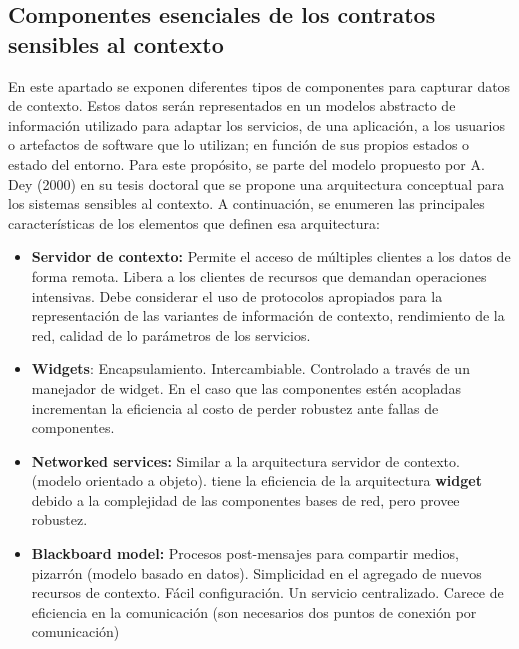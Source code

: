 \subsection{Componentes esenciales de los contratos sensibles al contexto}

En este apartado se exponen diferentes tipos de componentes para capturar datos de 
contexto. Estos datos serán representados en un modelos abstracto de información  utilizado para adaptar los servicios, de una aplicación, a los usuarios o artefactos de software que lo utilizan; en función de sus propios estados o estado del entorno. Para este propósito, se parte del modelo propuesto por A. Dey (2000) en su tesis doctoral \cite{Dey} que se propone una arquitectura conceptual para los sistemas sensibles  al contexto. A continuación, se enumeren las principales características de los elementos que definen esa arquitectura:


\begin{itemize}

\item \textbf {Servidor de contexto:}  Permite el acceso de múltiples
clientes a los datos de forma remota.  Libera a los clientes de
recursos que demandan operaciones intensivas.  Debe considerar el uso
de protocolos apropiados para la representación de las variantes de información de contexto, rendimiento de la red, calidad de lo parámetros de los servicios.


\item \textbf{Widgets}:  Encapsulamiento.  Intercambiable.
Controlado a través de un manejador de widget. En el caso que las
componentes estén acopladas incrementan la eficiencia al costo de perder robustez ante fallas de componentes.


\item \textbf{Networked services:}  Similar a la arquitectura
servidor de contexto. (modelo orientado a objeto).  tiene la eficiencia de la arquitectura \textbf{widget} debido a la complejidad de las componentes bases de red, pero provee robustez.


\item \textbf{Blackboard model:}  Procesos post-mensajes para
compartir medios, pizarrón (modelo basado en datos). Simplicidad en el agregado de nuevos recursos de contexto.  Fácil configuración.  Un servicio centralizado.  Carece de eficiencia en la comunicación (son
necesarios dos puntos de conexión por comunicación)

\end{itemize}

